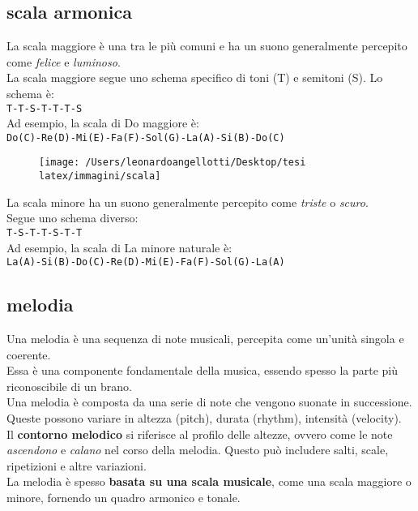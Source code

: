 \documentclass[a4paper,12pt]{report}
\begin{document}
\subsection{scala armonica}

La scala maggiore è una tra le più comuni e ha un suono generalmente percepito come \textit{felice} e \textit{luminoso}. \\
La scala maggiore segue uno schema specifico di toni (T) e semitoni (S). Lo schema è: \\
\texttt{T-T-S-T-T-T-S} \\
Ad esempio, la scala di Do maggiore è: \\
\texttt{Do(C)-Re(D)-Mi(E)-Fa(F)-Sol(G)-La(A)-Si(B)-Do(C)} 

\begin{figure}[H]
    \centering
    \texttt{[image: /Users/leonardoangellotti/Desktop/tesi latex/immagini/scala]} 
    \label{fig:immagine13}
\end{figure}

La scala minore ha un suono generalmente percepito come \textit{triste} o \textit{scuro}.  \\
Segue uno schema diverso: \\
\texttt{T-S-T-T-S-T-T} \\
Ad esempio, la scala di La minore naturale è: \\
\texttt{La(A)-Si(B)-Do(C)-Re(D)-Mi(E)-Fa(F)-Sol(G)-La(A)} 

\subsection{melodia}

Una melodia è una sequenza di note musicali, percepita come un'unità singola e coerente. \\
Essa è una componente fondamentale della musica, essendo spesso la parte più riconoscibile di un brano. \\
Una melodia è composta da una serie di note che vengono suonate in successione. Queste possono variare in altezza (pitch), durata (rhythm), intensità (velocity). \\
Il \textbf{contorno melodico} si riferisce al profilo delle altezze, ovvero come le note \textit{ascendono} e \textit{calano} nel corso della melodia. Questo può includere salti, scale, ripetizioni e altre variazioni. \\
La melodia è spesso \textbf{basata su una scala musicale}, come una scala maggiore o minore, fornendo un quadro armonico e tonale. 
\end{document}
